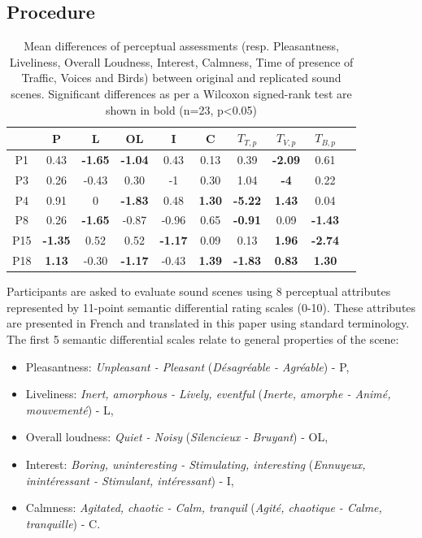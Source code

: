 \documentclass[twocolumn]{article}
\begin{document}
\subsection{Procedure}
\label{sec:exp_proc}

\begin{table}[t!]
\centering
\caption{Mean differences of perceptual assessments (resp. Pleasantness, Liveliness, Overall Loudness, Interest, Calmness, Time of presence of Traffic, Voices and Birds) between original and replicated sound scenes. Significant differences as per a Wilcoxon signed-rank test are shown in bold (n=23, p<0.05)}
\label{tab:ogrep}
\begin{tabular}{ c | c c c c c c c c c }
\hline
	 & P & L & OL & I & C & $T_{T, p}$ & $T_{V, p}$ & $T_{B, p}$ \\ \hline
	P1 & 0.43 & \textbf{-1.65} & \textbf{-1.04} & 0.43 & 0.13 & 0.39 & \textbf{-2.09} & 0.61 \\
	P3 & 0.26 & -0.43 & 0.30 & -1 & 0.30 & 1.04 & \textbf{-4} & 0.22 \\
	P4 & 0.91 & 0 & \textbf{-1.83} & 0.48 & \textbf{1.30} & \textbf{-5.22} & \textbf{1.43} & 0.04 \\
	P8 & 0.26 & \textbf{-1.65} & -0.87 & -0.96 & 0.65 & \textbf{-0.91} & 0.09 & \textbf{-1.43} \\
	P15 & \textbf{-1.35} & 0.52 & 0.52 & \textbf{-1.17} & 0.09 & 0.13 & \textbf{1.96} & \textbf{-2.74} \\
	P18 & \textbf{1.13} & -0.30 & \textbf{-1.17} & -0.43 & \textbf{1.39} & \textbf{-1.83} & \textbf{0.83} & \textbf{1.30} \\ \hline
\end{tabular}
\end{table}


Participants are asked to evaluate sound scenes using 8 perceptual attributes represented by 11-point semantic differential rating scales (0-10). These attributes are presented in French and translated in this paper using standard terminology. The first 5 semantic differential scales relate to general properties of the scene:
\begin{itemize}
\item Pleasantness: \textit{Unpleasant - Pleasant} (\textit{D\'esagr\'eable - Agr\'eable}) - P,
\item Liveliness: \textit{Inert, amorphous - Lively, eventful} (\textit{Inerte, amorphe - Anim\'e, mouvement\'e}) - L,
\item Overall loudness: \textit{Quiet - Noisy} (\textit{Silencieux - Bruyant}) - OL,
\item Interest: \textit{Boring, uninteresting - Stimulating, interesting} (\textit{Ennuyeux, inint\'eressant - Stimulant, int\'eressant}) - I,
\item Calmness: \textit{Agitated, chaotic - Calm, tranquil} (\textit{Agit\'e, chaotique - Calme, tranquille}) - C.
\end{itemize}
\end{document}
